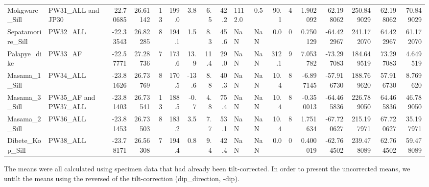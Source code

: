 \documentclass{article}
\begin{document}
{\begin{tabular}{llrrrrrrrllrrrrrrr}
Mokgware\_Sill            &                    PW31\_ALL and JP30 & -22.70685 &   26.61142 &  13 &   199.0 &     3.8 &   6.5 &  42.2 &  1112.0 &        0.5 &           90.1 &    4 &       1.902092 & -62.198062 &  250.849029 &     62.198062 &      70.849029 \\
Sepatamorire\_Sill        &                             PW32\_ALL & -22.33543 &   26.82285 &   8 &   194.1 &     1.5 &   8.3 &  45.6 &     NaN &        NaN &            0.0 &    0 &       0.750129 & -64.422967 &  241.172070 &     64.422967 &      61.172070 \\
Palapye\_dike             &                              PW33\_AF & -22.57771 &   27.28736 &   7 &   173.6 &    13.9 &  11.4 &  29.0 &     NaN &        NaN &          312.1 &    9 &       7.053782 & -73.297083 &  184.649519 &     73.297083 &       4.649519 \\
Masama\_1\_Sill            &                             PW34\_ALL & -23.81626 &   26.73769 &   8 &   170.5 &   -13.6 &   8.8 &  40.3 &     NaN &        NaN &           10.4 &    8 &      -6.897145 & -57.916730 &  188.769620 &     57.916730 &       8.769620 \\
Masama\_3\_Sill            &                 PW35\_AF and PW37\_ALL & -23.81403 &   26.73541 &  13 &   188.5 &    -0.7 &   4.8 &  75.4 &     NaN &        NaN &           10.4 &    8 &      -0.350013 & -64.465836 &  226.789050 &     64.465836 &      46.789050 \\
Masama\_2\_Sill            &                             PW36\_ALL & -23.81453 &   26.73503 &   8 &   183.2 &     3.5 &   7.7 &  53.1 &     NaN &        NaN &           10.4 &    8 &       1.751634 & -67.720627 &  215.197971 &     67.720627 &      35.197971 \\
Dibete\_Kop\_Sill          &                             PW38\_ALL & -23.78171 &   26.56308 &   7 &   194.4 &     0.8 &   9.4 &  42.4 &     NaN &        NaN &            0.0 &    0 &       0.400019 & -62.764502 &  239.478089 &     62.764502 &      59.478089 \\
\bottomrule
\end{tabular}
}

    

    The means were all calculated using specimen data that had already been
tilt-corrected. In order to present the uncorrected means, we untilt the
means using the reversed of the tilt-correction (dip\_direction, -dip).
\end{document}
